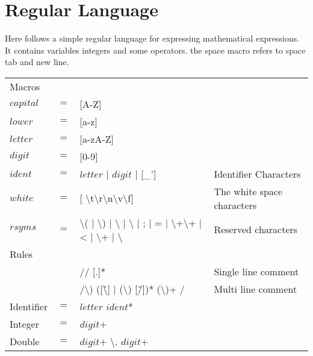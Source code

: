 \chapter{Regular Language}\label{reglang}
Here follows a simple regular language for expressing mathematical expressions.
It contains variables integers and some operators. the space macro refers to
space tab and new line.\\
\begin{tabular}{l c l l}
Macros\\
$capital$ & $=$ & [A-Z]\\
$lower$   & $=$ & [a-z]\\
$letter$  & $=$ & [a-zA-Z]\\
$digit$   & $=$ & [0-9]\\
$ident$   & $=$ & $letter$ | $digit$ | [\_'] & Identifier Characters\\
$white$   & $=$ & [ \textbackslash{t}\textbackslash{r}\textbackslash{n}\textbackslash{v}\textbackslash{f}] & The white space characters\\
$rsyms$   & $=$ & \textbackslash( | \textbackslash) | \textbackslash{ | \textbackslash} | ; | = | \textbackslash+\textbackslash+ | < | \textbackslash+ | \textbackslash* & Reserved characters\\
Rules\\
& & // [.]* & Single line comment\\
& & /\textbackslash*) ([\^\textbackslash*] | (\textbackslash*) [\^/])* (\textbackslash*)+ / & Multi line comment\\
Identifier & $=$ & $letter$ $ident$*\\
Integer    & $=$ & $digit$+\\
Double     & $=$ & $digit$+ \textbackslash. $digit$+\\
\end{tabular}
